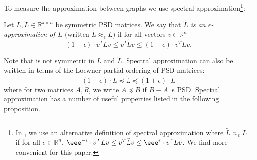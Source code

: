 \documentclass{toc}
\newcommand{\wt}{\widetilde}   %
\numberwithin{myalgctr}{section}
\theoremstyle{named}
\begin{document}
To measure the approximation between graphs we use spectral approximation\footnote{In \cite{derandbeyond2017}, we use an alternative definition of spectral approximation where $\wt{L}\approx_{\epsilon}L$ if for all $v\in\mathbb{R}^n$, $\eee^{-\epsilon}\cdot v^{T}Lv\leq v^T\wt{L}v\leq \eee^{\epsilon}\cdot v^{T}Lv$. We find  more convenient for this paper.}\cite{ST04}:
\begin{definition}
\label{def:spectralapprox}
Let $L, \wt{L}\in\mathbb{R}^{n\times n}$ be symmetric PSD matrices. We say that \emph{$\wt{L}$ is an \emph{$\epsilon$-approximation} of $L$} (written $\wt{L}\approx_{\epsilon}L$) if for all vectors $v\in\mathbb{R}^n$
\[
(1-\epsilon)\cdot v^{T}Lv \leq v^{T}\wt{L}v \leq (1+\epsilon)\cdot v^{T}Lv.
\]
\end{definition}
Note that  is not symmetric in $L$ and $\wt{L}$. Spectral approximation can also be written in terms of the Loewner partial ordering of PSD matrices:
\[
(1-\epsilon)\cdot L \preceq \wt{L} \preceq (1+\epsilon)\cdot L
\]
where for two matrices $A,B$, we write $A\preceq B$ if $B-A$ is PSD. Spectral approximation has a number of useful properties listed in the following proposition. 
\end{document}
